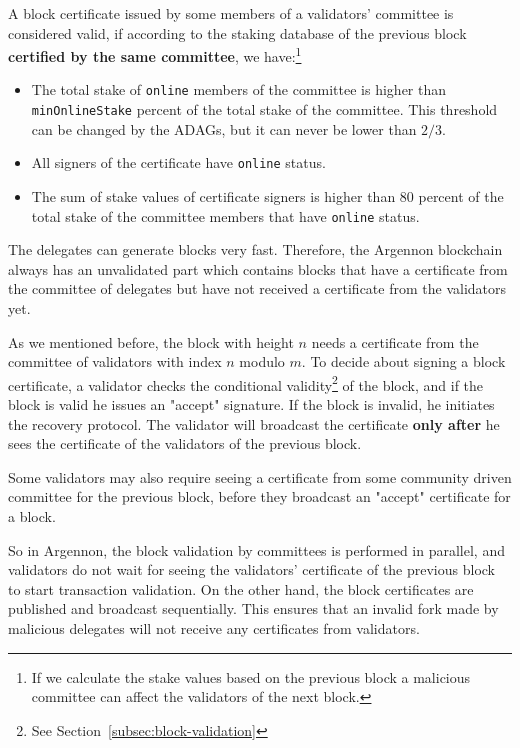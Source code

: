 
A block certificate issued by some members of a validators' committee is considered valid, if according to
the staking database of the previous block \textbf{certified by the same committee}, we have:\footnote{If we calculate
the stake values based on the previous block a malicious committee can affect the validators of the next block.}
\begin{itemize}
    \item The total stake of \texttt{online} members of the committee is higher than \texttt{minOnlineStake} percent
    of the total stake of the committee. This threshold can be changed by the ADAGs, but it can never be lower
    than $2/3$.
    \item All signers of the certificate have \texttt{online} status.
    \item The sum of stake values of certificate signers is higher than 80 percent of the total stake
    of the committee members that have \texttt{online} status.
\end{itemize}

The delegates can generate blocks very fast. Therefore, the Argennon blockchain always has an
unvalidated part which contains blocks that have a certificate from the committee of delegates but have not received
a certificate from the validators yet.

As we mentioned before, the block with height $n$ needs a certificate from the committee of
validators with index $n$ modulo $m$. To decide about signing a block certificate, a validator
checks the conditional validity\footnote{See Section~\ref{subsec:block-validation}} of the block, and
if the block is valid he issues
an "accept" signature. If the block is invalid, he initiates the recovery protocol. The validator will broadcast the
certificate \textbf{only after} he sees the certificate of the validators of the previous block.

Some validators may also require seeing a certificate from
some community driven committee for the previous block, before they broadcast an "accept" certificate for a block.

So in Argennon, the block validation by committees is performed in parallel, and validators
do not wait for seeing the validators' certificate of the previous block to start transaction validation. On the
other hand, the block certificates are published and broadcast sequentially. This ensures that an invalid
fork made by malicious delegates will not receive any certificates from validators.

